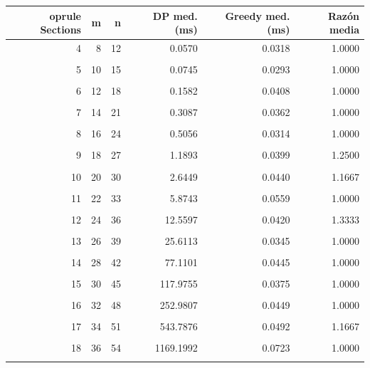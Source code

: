 \newcommand{\DPFitNameSubsets}{exponencial}
\newcommand{\GreedyFitNameSubsets}{n log n}
\newcommand{\DPFitEquationSubsets}{\ensuremath{0.00189294e^{0.245623x}}}
\newcommand{\GreedyFitEquationSubsets}{\ensuremath{0.0277876 + 0.000122748x\log x}}
\newcommand{\DPFitBICSubsets}{97.9440}
\newcommand{\GreedyFitBICSubsets}{-140.0271}
\newcommand{\DPRSquaredSubsets}{0.9950}
\newcommand{\GreedyRSquaredSubsets}{0.4489}

\begin{tabular}{rrrrrr}
    oprule
Sections & m & n & DP med. (ms) & Greedy med. (ms) & Raz\'on media \\
\midrule
4 & 8 & 12 & 0.0570 & 0.0318 & 1.0000 \\\\
5 & 10 & 15 & 0.0745 & 0.0293 & 1.0000 \\\\
6 & 12 & 18 & 0.1582 & 0.0408 & 1.0000 \\\\
7 & 14 & 21 & 0.3087 & 0.0362 & 1.0000 \\\\
8 & 16 & 24 & 0.5056 & 0.0314 & 1.0000 \\\\
9 & 18 & 27 & 1.1893 & 0.0399 & 1.2500 \\\\
10 & 20 & 30 & 2.6449 & 0.0440 & 1.1667 \\\\
11 & 22 & 33 & 5.8743 & 0.0559 & 1.0000 \\\\
12 & 24 & 36 & 12.5597 & 0.0420 & 1.3333 \\\\
13 & 26 & 39 & 25.6113 & 0.0345 & 1.0000 \\\\
14 & 28 & 42 & 77.1101 & 0.0445 & 1.0000 \\\\
15 & 30 & 45 & 117.9755 & 0.0375 & 1.0000 \\\\
16 & 32 & 48 & 252.9807 & 0.0449 & 1.0000 \\\\
17 & 34 & 51 & 543.7876 & 0.0492 & 1.1667 \\\\
18 & 36 & 54 & 1169.1992 & 0.0723 & 1.0000 \\\\
\bottomrule
\end{tabular}

